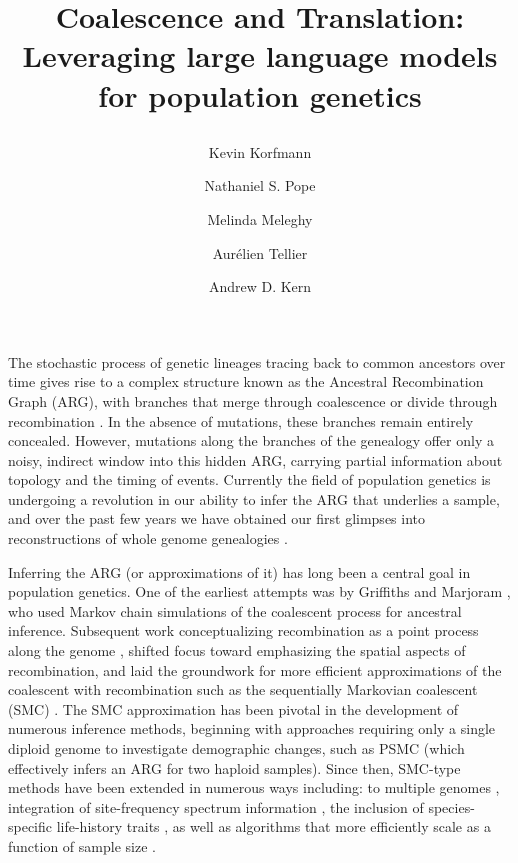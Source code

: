 \documentclass{article}
\title{\raggedright Coalescence and Translation:\\Leveraging large language models for population genetics}
\author[1]{\raggedright Kevin Korfmann}
\author[1]{\raggedright Nathaniel S. Pope}
\author[2]{\raggedright Melinda Meleghy}
\author[2]{\raggedright Aurélien Tellier}
\author[1]{\raggedright Andrew D. Kern}
\affil[1]{\raggedright University of Oregon, Institute of Ecology and Evolution, Eugene, USA}
\affil[2]{\raggedright Technical University of Munich, Department of Life Science Systems, Munich, Germany}
\date{}
\let\citep\parencite
\begin{document}
The stochastic process of genetic lineages tracing back to common ancestors over time gives rise to a complex structure known as the Ancestral Recombination Graph (ARG), with branches that merge through coalescence or divide
through recombination \citep{kingman_coalescent_1982, hudson_properties_1983, griffiths_ancestral_1997, griffiths_two-locus_1991}. 
In the absence of mutations, these branches remain entirely concealed. 
However, mutations along the branches of the genealogy offer only a noisy, indirect window into this hidden ARG, 
carrying partial information about topology and the timing of events.
Currently the field of population genetics is undergoing a revolution in our ability to infer the ARG that underlies
a sample, and over the past few years we have obtained our first glimpses into reconstructions of whole genome genealogies \citep{kelleher_inferring_2019, speidel_method_2019, zhang2023biobank, deng_robust_2024}. 

Inferring the ARG (or approximations of it) has long been a central goal in population genetics.
One of the earliest attempts was by Griffiths and Marjoram \citeyear{griffiths_ancestral_1996}, 
who used Markov chain simulations of the coalescent process for ancestral inference.
Subsequent work conceptualizing recombination as a point process along the genome \citep{wiuf_recombination_1999},
shifted focus toward emphasizing the spatial aspects of recombination,
and laid the groundwork for more efficient approximations of the coalescent with recombination such as the sequentially Markovian coalescent (SMC) \citep{mcvean_approximating_2005}.
The SMC approximation has been pivotal in the development of numerous inference methods, 
beginning with approaches requiring only a single diploid genome to investigate demographic changes,
such as PSMC \citep{li_inference_2011} (which effectively infers an ARG for two haploid samples). 
Since then, SMC-type methods have been extended in numerous ways including: 
to multiple genomes \citep{schiffels_inferring_2014, malaspinas_genomic_2016}, 
integration of site-frequency spectrum information \citep{terhorst_robust_2017},
the inclusion of species-specific life-history traits 
\citep[e.g.][]{sellinger_inference_2020,korfmann_simultaneous_2024, sellinger_improved_2024},
as well as algorithms that more efficiently scale as a function of sample size \citep{palamara_high-throughput_2018, schweiger_ultra-fast_2023, terhorst_accelerated_2024}. 
\end{document}
